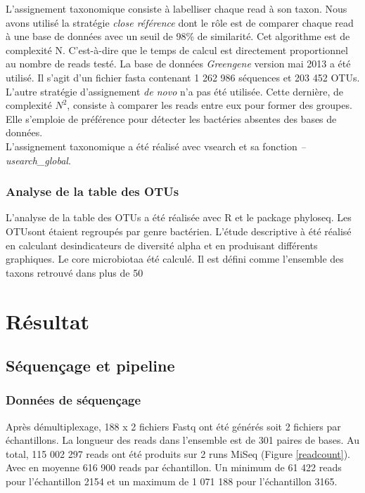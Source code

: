 \documentclass[12pt,a4paper]{article}
\begin{document}
L’assignement taxonomique consiste à labelliser chaque read à son taxon. Nous avons utilisé la stratégie \textit{close référence} dont le rôle est de comparer chaque read à une base de données avec un seuil de 98\% de similarité. Cet algorithme est de complexité N. C'est-à-dire que le temps de calcul est directement proportionnel au nombre de reads testé. La base de données \textit{Greengene} version mai 2013  a été utilisé. Il s'agit d'un fichier fasta contenant 1 262 986 séquences et 203 452 OTUs. \\
L'autre stratégie d'assignement \textit{de novo} n'a pas été utilisée. Cette dernière, de complexité $N^{2}$, consiste à comparer les reads entre eux pour former des groupes. Elle s'emploie de préférence pour détecter les bactéries absentes des bases de données. \\
L'assignement taxonomique a été réalisé avec vsearch et sa fonction \textit{--usearch\_global}. 

\subsubsection{Analyse de la table des OTUs}
L’analyse de la table des OTUs a été réalisée avec R et le package phyloseq. Les OTUsont étaient regroupés par genre bactérien. L’étude descriptive à été réalisé en calculant desindicateurs de diversité alpha et en produisant différents graphiques. Le core microbiotaa été calculé. Il est défini comme l’ensemble des taxons retrouvé dans plus de 50%


\section{Résultat}
\subsection{Séquençage et pipeline}
\subsubsection{Données de séquençage}
Après démultiplexage, 188 x 2 fichiers Fastq ont été générés soit 2 fichiers par échantillons.
La longueur des reads dans l'ensemble est de 301 paires de bases.
Au total, 115 002 297 reads ont été produits sur 2 runs MiSeq (Figure \ref{readcount}). Avec en moyenne 616 900 reads par échantillon. Un minimum de 61 422 reads pour l’échantillon 2154 et un maximum de 1 071 188 pour l’échantillon 3165. 
\end{document}
